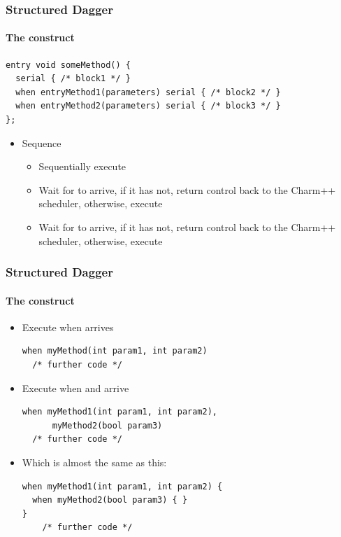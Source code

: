 \begin{frame}[fragile]
  \frametitle{Structured Dagger}
  \framesubtitle{The  construct}
      \begin{lstlisting}[basicstyle=\tiny]
entry void someMethod() {
  serial { /* block1 */ }
  when entryMethod1(parameters) serial { /* block2 */ }
  when entryMethod2(parameters) serial { /* block3 */ }
};
      \end{lstlisting}
  \begin{itemize}
    \item Sequence
      \pause
      \begin{itemize}
        \item Sequentially execute 
          \pause
        \item Wait for  to arrive, if it has not, return control
          back to the Charm++ scheduler, otherwise, execute 
          \pause
        \item Wait for  to arrive, if it has not, return control
          back to the Charm++ scheduler, otherwise, execute 
      \end{itemize}
    \end{itemize}
\end{frame}

\begin{frame}[fragile]
  \frametitle{Structured Dagger}
  \framesubtitle{The  construct}
  \begin{itemize}
  \item Execute  when  arrives
  \begin{lstlisting}[basicstyle=\scriptsize]
when myMethod(int param1, int param2)
  /* further code */
  \end{lstlisting}

  \item Execute  when  and  arrive
  \begin{lstlisting}[basicstyle=\scriptsize]
when myMethod1(int param1, int param2),
      myMethod2(bool param3)
  /* further code */
  \end{lstlisting}

\item Which is almost the same as this:
  \begin{lstlisting}[basicstyle=\scriptsize]
when myMethod1(int param1, int param2) {
  when myMethod2(bool param3) { }
}
    /* further code */
  \end{lstlisting}

  \end{itemize}
\end{frame}

